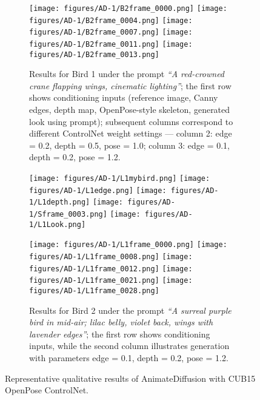\documentclass[final-report]{report-template}
\begin{document}
\begin{figure}[htbp]
    
    \begin{subfigure}[t]{\textwidth}
        \centering
        \texttt{[image: figures/AD-1/B2frame\_0000.png]}
        \texttt{[image: figures/AD-1/B2frame\_0004.png]}
        \texttt{[image: figures/AD-1/B2frame\_0007.png]}
        \texttt{[image: figures/AD-1/B2frame\_0011.png]}
        \texttt{[image: figures/AD-1/B2frame\_0013.png]}
        \caption{Results for Bird 1 under the prompt \textit{“A red-crowned crane flapping wings, cinematic lighting”}; the first row shows conditioning inputs (reference image, Canny edges, depth map, OpenPose-style skeleton, generated look using prompt); subsequent columns correspond to different ControlNet weight settings — column 2: edge = 0.2, depth = 0.5, pose = 1.0; column 3: edge = 0.1, depth = 0.2, pose = 1.2.}
        \label{bird1}
    \end{subfigure}

    \begin{subfigure}[t]{\textwidth}
        \centering
        \texttt{[image: figures/AD-1/L1mybird.png]}
        \texttt{[image: figures/AD-1/L1edge.png]}
        \texttt{[image: figures/AD-1/L1depth.png]}
        \texttt{[image: figures/AD-1/Sframe\_0003.png]}
        \texttt{[image: figures/AD-1/L1Look.png]}
    \end{subfigure}
    
    \begin{subfigure}[t]{\textwidth}
        \centering
        \texttt{[image: figures/AD-1/L1frame\_0000.png]}
        \texttt{[image: figures/AD-1/L1frame\_0008.png]}
        \texttt{[image: figures/AD-1/L1frame\_0012.png]}
        \texttt{[image: figures/AD-1/L1frame\_0021.png]}
        \texttt{[image: figures/AD-1/L1frame\_0028.png]}
        \caption{Results for Bird 2 under the prompt \textit{“A surreal purple bird in mid-air; lilac belly, violet back, wings with lavender edges”}; the first row shows conditioning inputs, while the second column illustrates generation with parameters edge = 0.1, depth = 0.2, pose = 1.2.}
        \label{bird2}
    \end{subfigure}
    
    \caption{Representative qualitative results of AnimateDiffusion with CUB15 OpenPose ControlNet.}
    \label{fig:five_by_five}
\end{figure}
\end{document}
